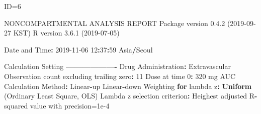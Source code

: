 \documentclass[12pt,]{krantz}
\newenvironment{Shaded}{\begin{snugshade}}{\end{snugshade}}
\newcommand{\ControlFlowTok}[1]{\textcolor[rgb]{0.13,0.29,0.53}{\textbf{#1}}}
\newcommand{\DecValTok}[1]{\textcolor[rgb]{0.00,0.00,0.81}{#1}}
\newcommand{\FloatTok}[1]{\textcolor[rgb]{0.00,0.00,0.81}{#1}}
\newcommand{\KeywordTok}[1]{\textcolor[rgb]{0.13,0.29,0.53}{\textbf{#1}}}
\newcommand{\NormalTok}[1]{#1}
\newcommand{\OperatorTok}[1]{\textcolor[rgb]{0.81,0.36,0.00}{\textbf{#1}}}
\newcommand{\StringTok}[1]{\textcolor[rgb]{0.31,0.60,0.02}{#1}}
\begin{document}
\begin{Shaded}
\begin{Highlighting}[]
\NormalTok{ID=}\DecValTok{6}

\NormalTok{                        NONCOMPARTMENTAL ANALYSIS REPORT}
\NormalTok{                       Package version }\DecValTok{0}\NormalTok{.}\FloatTok{4.2}\NormalTok{ (}\DecValTok{2019-09-27}\NormalTok{ KST)}
\NormalTok{                          R version }\DecValTok{3}\NormalTok{.}\FloatTok{6.1}\NormalTok{ (}\DecValTok{2019-07-05}\NormalTok{)}

\NormalTok{Date and Time}\OperatorTok{:}\StringTok{ }\DecValTok{2019-11-06} \DecValTok{12}\OperatorTok{:}\DecValTok{37}\OperatorTok{:}\DecValTok{59}\NormalTok{ Asia}\OperatorTok{/}\NormalTok{Seoul}

\NormalTok{Calculation Setting}
\OperatorTok{-------------------}
\NormalTok{Drug Administration}\OperatorTok{:}\StringTok{ }\NormalTok{Extravascular}
\NormalTok{Observation count excluding trailing zero}\OperatorTok{:}\StringTok{ }\DecValTok{11}
\NormalTok{Dose at time }\DecValTok{0}\OperatorTok{:}\StringTok{ }\DecValTok{320}\NormalTok{ mg}
\NormalTok{AUC Calculation Method}\OperatorTok{:}\StringTok{ }\NormalTok{Linear}\OperatorTok{-}\NormalTok{up Linear}\OperatorTok{-}\NormalTok{down}
\NormalTok{Weighting }\ControlFlowTok{for}\NormalTok{ lambda z}\OperatorTok{:}\StringTok{ }\KeywordTok{Uniform}\NormalTok{ (Ordinary Least Square, OLS)}
\NormalTok{Lambda z selection criterion}\OperatorTok{:}\StringTok{ }\NormalTok{Heighest adjusted R}\OperatorTok{-}\NormalTok{squared value with precision=}\FloatTok{1e-4}



\end{Highlighting}
\end{Shaded}
\end{document}
